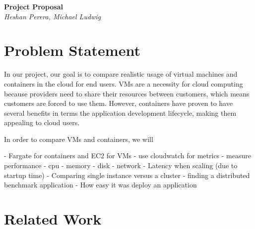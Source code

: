 \documentclass[11pt]{article}
\begin{document}
\renewcommand{\headrulewidth}{0pt} 
\renewcommand{\footrulewidth}{0pt} 
\pagestyle{fancy}
\cfoot{}
\lhead{}
\rhead{}
\lfoot{\itshape\textcolor{gray}{CS525T Cloud Computing Paper Review}}

\begin{center}
{\LARGE \bf Project Proposal} \\
{\normalsize \emph{Heshan Perera, Michael Ludwig}}\\

\end{center}

\section{Problem Statement}

In our project, our goal is to compare realistic usage of virtual machines and containers in the cloud for end users. VMs are a necessity for cloud computing because providers need to share their resources between customers, which means customers are forced to use them. However, containers have proven to have several benefits in terms the application development lifecycle, making them appealing to cloud users.

In order to compare VMs and containers, we will 

- Fargate for containers and EC2 for VMs
- use cloudwatch for metrics
- measure performance
  - cpu
  - memory
  - disk
  - network
- Latency when scaling (due to startup time)
- Comparing single instance versus a cluster
  - finding a distributed benchmark application
- How easy it was deploy an application

\section{Related Work}

\end{document}
